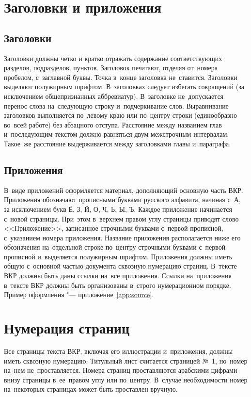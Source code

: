 \documentclass[a4paper,12pt]{diplom}
\begin{document}
\section{Заголовки и приложения}

\subsection{Заголовки}
Заголовки должны четко и кратко отражать содержание соответствующих разделов, подразделов, пунктов.
Заголовок печатают, отделяя от~номера пробелом, с~заглавной буквы. Точка в~конце заголовка не~ставится.
Заголовки выделяют полужирным шрифтом.
В~заголовках следует избегать сокращений (за исключением общепризнанных аббревиатур). В~заголовке не~допускается перенос слова на~следующую строку и~подчеркивание слов.
Выравнивание заголовков выполняется по~левому краю или по~центру строки (единообразно во~всей работе) без абзацного отступа.
Расстояние между названием глав и~последующим текстом должно равняться двум межстрочным интервалам. Такое~же расстояние выдерживается между заголовками главы и~параграфа.

\subsection{Приложения}
В~виде приложений оформляется материал, дополняющий основную часть ВКР.
Приложения обозначают прописными буквами русского алфавита, начиная с~А, за исключением букв Ё, З, Й, О, Ч, Ь, Ы, Ъ.
Каждое приложение начинается с~новой страницы.  При~этом в~верхнем правом углу страницы приводят слово <<Приложение>>, записанное строчными буквами с~первой прописной, с~указанием номера приложения.
Название приложения располагается ниже его обозначения на~отдельной строке по~центру  строчными буквами с~первой прописной и~выделяется полужирным шрифтом.
Приложения должны иметь общую с~основной частью документа сквозную нумерацию страниц.
В~тексте ВКР должны быть даны ссылки на~все приложения.
Ссылки на~приложения в~тексте ВКР должны быть организованы в~строго нумерационном порядке.
Пример оформления "--- приложение~\ref{app:source}.

\section{Нумерация страниц}
Все страницы текста ВКР, включая его иллюстрации и~приложения, должны иметь сквозную нумерацию.
Титульный лист считается страницей №~1, но~номер на~нем не~проставляется.
Номера страниц проставляются арабскими цифрами внизу страницы в~ее~правом углу или по~центру. В~случае необходимости номер на~некоторых страницах может быть проставлен вручную.
\end{document}
